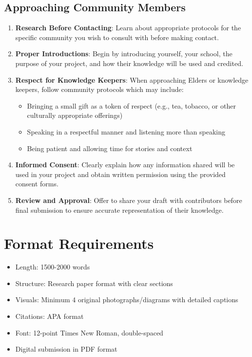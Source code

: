 \documentclass[12pt]{article}
\begin{document}
\subsection*{Approaching Community Members}
\begin{enumerate}
    \item \textbf{Research Before Contacting}: Learn about appropriate protocols for the specific community you wish to consult with before making contact.
    
    \item \textbf{Proper Introductions}: Begin by introducing yourself, your school, the purpose of your project, and how their knowledge will be used and credited.
    
    \item \textbf{Respect for Knowledge Keepers}: When approaching Elders or knowledge keepers, follow community protocols which may include:
    \begin{itemize}
        \item Bringing a small gift as a token of respect (e.g., tea, tobacco, or other culturally appropriate offerings)
        \item Speaking in a respectful manner and listening more than speaking
        \item Being patient and allowing time for stories and context
    \end{itemize}
    
    \item \textbf{Informed Consent}: Clearly explain how any information shared will be used in your project and obtain written permission using the provided consent forms.
    
    \item \textbf{Review and Approval}: Offer to share your draft with contributors before final submission to ensure accurate representation of their knowledge.
\end{enumerate}


\section*{Format Requirements}
\begin{itemize}
    \item Length: 1500-2000 words
    \item Structure: Research paper format with clear sections
    \item Visuals: Minimum 4 original photographs/diagrams with detailed captions
    \item Citations: APA format
    \item Font: 12-point Times New Roman, double-spaced
    \item Digital submission in PDF format
\end{itemize}
\end{document}
